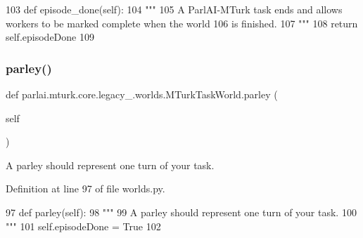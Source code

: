 \begin{DoxyCode}
103     \textcolor{keyword}{def }episode\_done(self):
104         \textcolor{stringliteral}{"""}
105 \textcolor{stringliteral}{        A ParlAI-MTurk task ends and allows workers to be marked complete when the world}
106 \textcolor{stringliteral}{        is finished.}
107 \textcolor{stringliteral}{        """}
108         \textcolor{keywordflow}{return} self.episodeDone
109 
\end{DoxyCode}
\mbox{\label{classparlai_1_1mturk_1_1core_1_1legacy__2018_1_1worlds_1_1MTurkTaskWorld_a5a4829e5228dd558dac94987e9ba6af4}} 
\subsubsection{\texorpdfstring{parley()}{parley()}}
{\footnotesize\ttfamily def parlai.\+mturk.\+core.\+legacy\+\_.\+worlds.\+M\+Turk\+Task\+World.\+parley (\begin{DoxyParamCaption}\item[{}]{self }\end{DoxyParamCaption})}

\begin{DoxyVerb}A parley should represent one turn of your task.
\end{DoxyVerb}
 

Definition at line 97 of file worlds.\+py.


\begin{DoxyCode}
97     \textcolor{keyword}{def }parley(self):
98         \textcolor{stringliteral}{"""}
99 \textcolor{stringliteral}{        A parley should represent one turn of your task.}
100 \textcolor{stringliteral}{        """}
101         self.episodeDone = \textcolor{keyword}{True}
102 
\end{DoxyCode}
\mbox{\label{classparlai_1_1mturk_1_1core_1_1legacy__2018_1_1worlds_1_1MTurkTaskWorld_a9b6bbd7adb1a01ef6e1ec6b4b251c1cf}} 
